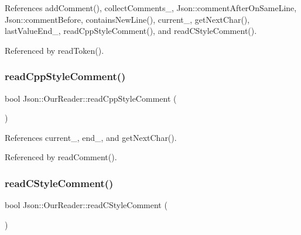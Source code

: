 References add\+Comment(), collect\+Comments\+\_\+, Json\+::comment\+After\+On\+Same\+Line, Json\+::comment\+Before, contains\+New\+Line(), current\+\_\+, get\+Next\+Char(), last\+Value\+End\+\_\+, read\+Cpp\+Style\+Comment(), and read\+C\+Style\+Comment().



Referenced by read\+Token().

\mbox{\label{classJson_1_1OurReader_ae3de80671f0f997053e1c1c8a47a45c5_ae3de80671f0f997053e1c1c8a47a45c5}} 
\subsubsection{\texorpdfstring{read\+Cpp\+Style\+Comment()}{readCppStyleComment()}}
{\footnotesize\ttfamily bool Json\+::\+Our\+Reader\+::read\+Cpp\+Style\+Comment (\begin{DoxyParamCaption}{ }\end{DoxyParamCaption})\hspace{0.3cm}{\ttfamily [private]}}



References current\+\_\+, end\+\_\+, and get\+Next\+Char().



Referenced by read\+Comment().

\mbox{\label{classJson_1_1OurReader_aba784b125baa1b62387e767b791f2f89_aba784b125baa1b62387e767b791f2f89}} 
\subsubsection{\texorpdfstring{read\+C\+Style\+Comment()}{readCStyleComment()}}
{\footnotesize\ttfamily bool Json\+::\+Our\+Reader\+::read\+C\+Style\+Comment (\begin{DoxyParamCaption}{ }\end{DoxyParamCaption})\hspace{0.3cm}{\ttfamily [private]}}



